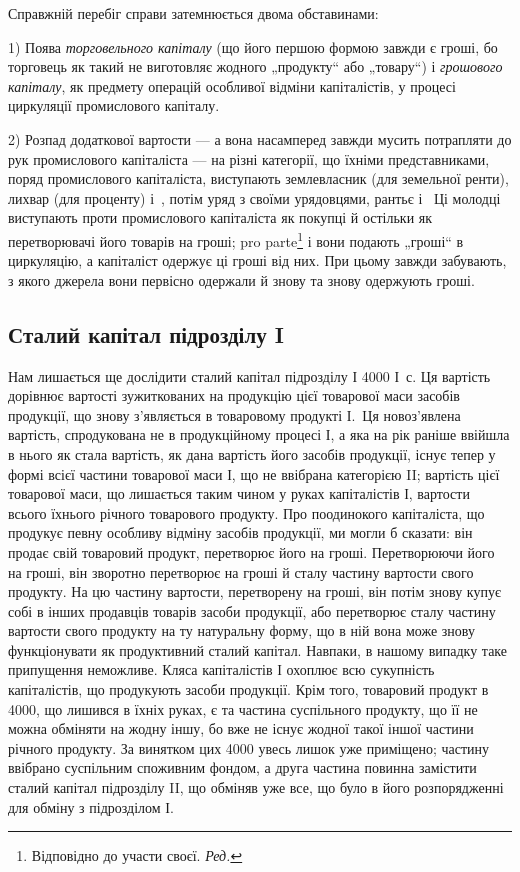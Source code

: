 
Справжній перебіг справи затемнюється двома обставинами:

1) Поява \emph{торговельного капіталу} (що його першою формою
завжди є гроші, бо торговець як такий не виготовляє жодного
„продукту“ або „товару“) і \emph{грошового капіталу}, як предмету
операцій особливої відміни капіталістів, у процесі циркуляції промислового
капіталу.

2) Розпад додаткової вартости — а вона насамперед завжди мусить
потрапляти до рук промислового капіталіста — на різні категорії, що їхніми
представниками, поряд промислового капіталіста, виступають землевласник
(для земельної ренти), лихвар (для проценту) і~, потім уряд з своїми
урядовцями, рантьє і~ Ці молодці виступають проти промислового
капіталіста як покупці й остільки як перетворювачі його товарів на гроші;
pro parte\footnote*{
Відповідно до участи своєї. \emph{Ред.}
} і вони подають „гроші“ в циркуляцію, а капіталіст одержує
ці гроші від них. При цьому завжди забувають, з якого джерела вони
первісно одержали й знову та знову одержують гроші.
\label{original-325-1}

\subsection[Сталий капітал підрозділу I]{Сталий капітал підрозділу I\footnotemark{}}

\label{original-325-2}
Нам%
лишається ще дослідити сталий капітал підрозділу І \deq{} 4000 І~$с$.
Ця вартість дорівнює вартості зужиткованих на продукцію цієї товарової
маси засобів продукції, що знову з’являється в товаровому продукті І.~Ця новоз’явлена вартість, спродукована не в продукційному процесі І, а
яка на рік раніше ввійшла в нього як стала вартість, як дана вартість
його засобів продукції, існує тепер у формі всієї частини товарової маси І,
що не ввібрана категорією II; вартість цієї товарової маси, що лишається
таким чином у руках капіталістів І, \deq{}  вартости всього їхнього річного
товарового продукту. Про поодинокого капіталіста, що продукує певну
особливу відміну засобів продукції, ми могли б сказати: він продає свій
товаровий продукт, перетворює його на гроші. Перетворюючи його на
гроші, він зворотно перетворює на гроші й сталу частину вартости свого
продукту. На цю частину вартости, перетворену на гроші, він потім знову
купує собі в інших продавців товарів засоби продукції, або перетворює
сталу частину вартости свого продукту на ту натуральну форму, що
в ній вона може знову функціонувати як продуктивний сталий капітал.
Навпаки, в нашому випадку таке припущення неможливе. Кляса капіталістів
І охоплює всю сукупність капіталістів, що продукують засоби продукції.
Крім того, товаровий продукт в 4000, що лишився в їхніх руках,
є та частина суспільного продукту, що її не можна обміняти на жодну
іншу, бо вже не існує жодної такої іншої частини річного продукту. За
винятком цих 4000 увесь лишок уже приміщено; частину ввібрано суспільним
споживним фондом, а друга частина повинна замістити сталий
капітал підрозділу II, що обміняв уже все, що було в його розпорядженні
для обміну з підрозділом І.
\parbreak{}  %
